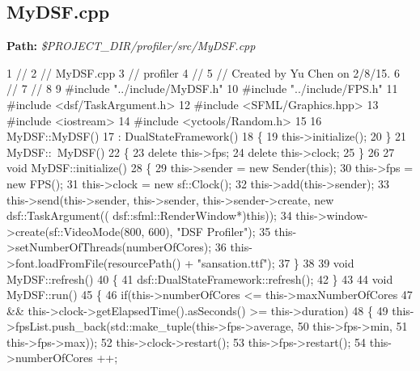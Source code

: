  \hypertarget{_benchmark_program_BenchmarkProgramMyDSF_cpp}{}\subsection{My\+D\+S\+F.\+cpp}\label{_benchmark_program_BenchmarkProgramMyDSF_cpp}
{\bfseries Path\+:} {\itshape \$\+P\+R\+O\+J\+E\+C\+T\+\_\+\+D\+I\+R/profiler/src/\+My\+D\+S\+F.cpp} 
\begin{DoxyCodeInclude}
1 \textcolor{comment}{//}
2 \textcolor{comment}{//  MyDSF.cpp}
3 \textcolor{comment}{//  profiler}
4 \textcolor{comment}{//}
5 \textcolor{comment}{//  Created by Yu Chen on 2/8/15.}
6 \textcolor{comment}{//}
7 \textcolor{comment}{//}
8 
9 \textcolor{preprocessor}{#include "../include/MyDSF.h"}
10 \textcolor{preprocessor}{#include "../include/FPS.h"}
11 \textcolor{preprocessor}{#include <dsf/TaskArgument.h>}
12 \textcolor{preprocessor}{#include <SFML/Graphics.hpp>}
13 \textcolor{preprocessor}{#include <iostream>}
14 \textcolor{preprocessor}{#include <yctools/Random.h>}
15 
16 MyDSF::MyDSF()
17 : DualStateFramework()
18 \{
19     this->initialize();
20 \}
21 MyDSF::~MyDSF()
22 \{
23     \textcolor{keyword}{delete} this->fps;
24     \textcolor{keyword}{delete} this->clock;
25 \}
26 
27 \textcolor{keywordtype}{void} MyDSF::initialize()
28 \{
29     this->sender = \textcolor{keyword}{new} Sender(\textcolor{keyword}{this});
30     this->fps = \textcolor{keyword}{new} FPS();
31     this->clock = \textcolor{keyword}{new} sf::Clock();
32     this->add(this->sender);
33     this->send(this->sender, this->sender, this->sender->create, \textcolor{keyword}{new} dsf::TaskArgument((
      dsf::sfml::RenderWindow*)\textcolor{keyword}{this}));
34     this->window->create(sf::VideoMode(800, 600), \textcolor{stringliteral}{"DSF Profiler"});
35     this->setNumberOfThreads(numberOfCores);
36     this->font.loadFromFile(resourcePath() + \textcolor{stringliteral}{"sansation.ttf"});
37 \}
38 
39 \textcolor{keywordtype}{void} MyDSF::refresh()
40 \{
41     dsf::DualStateFramework::refresh();
42 \}
43 
44 \textcolor{keywordtype}{void} MyDSF::run()
45 \{
46     \textcolor{keywordflow}{if}(this->numberOfCores <= this->maxNumberOfCores
47        && this->clock->getElapsedTime().asSeconds() >= this->duration)
48     \{
49         this->fpsList.push\_back(std::make\_tuple(this->fps->average,
50                                                 this->fps->min,
51                                                 this->fps->max));
52         this->clock->restart();
53         this->fps->restart();
54         this->numberOfCores ++;

\end{DoxyCodeInclude}
